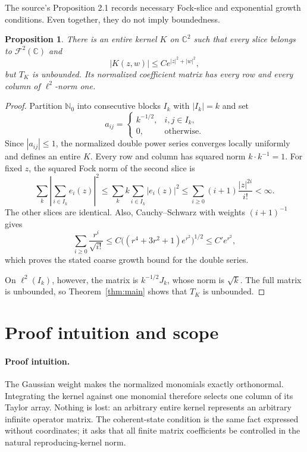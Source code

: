 \documentclass[11pt]{article}
\newtheorem{proposition}[theorem]{Proposition}
\theoremstyle{remark}
\newcommand{\C}{\mathbb{C}}
\newcommand{\F}{\mathcal{F}}
\begin{document}
The source's Proposition 2.1 records necessary Fock-slice and exponential
growth conditions.  Even together, they do not imply boundedness.

\begin{proposition}\label{prop:block}
There is an entire kernel $K$ on $\C^2$ such that every slice belongs to
$\F^2(\C)$ and
\[
 |K(z,w)|\leq C e^{|z|^2+|w|^2},
\]
but $T_K$ is unbounded.  Its normalized coefficient matrix has every row and
every column of $\ell^2$-norm one.
\end{proposition}

\begin{proof}
Partition $\mathbb N_0$ into consecutive blocks $I_k$ with $|I_k|=k$ and set
\[
 a_{ij}=\begin{cases}
 k^{-1/2},&i,j\in I_k,\\
 0,&\text{otherwise}.
 \end{cases}
\]
Since $|a_{ij}|\leq1$, the normalized double power series converges locally
uniformly and defines an entire $K$.  Every row and column has squared norm
$k\cdot k^{-1}=1$.  For fixed $z$, the squared Fock norm of the second slice
is
\[
 \sum_k\left|\sum_{i\in I_k}e_i(z)\right|^2
 \leq\sum_k k\sum_{i\in I_k}|e_i(z)|^2
 \leq\sum_{i\geq0}(i+1)\frac{|z|^{2i}}{i!}<\infty.
\]
The other slices are identical.  Also, Cauchy--Schwarz with weights
$(i+1)^{-1}$ gives
\[
 \sum_{i\geq0}\frac{r^i}{\sqrt{i!}}
 \leq C\bigl((r^4+3r^2+1)e^{r^2}\bigr)^{1/2}
 \leq C'e^{r^2},
\]
which proves the stated coarse growth bound for the double series.

On $\ell^2(I_k)$, however, the matrix is $k^{-1/2}J_k$, whose norm is
$\sqrt{k}$.  The full matrix is unbounded, so Theorem~\ref{thm:main} shows
that $T_K$ is unbounded.
\end{proof}

\section{Proof intuition and scope}

\paragraph{Proof intuition.}
The Gaussian weight makes the normalized monomials exactly orthonormal.
Integrating the kernel against one monomial therefore selects one column of
its Taylor array.  Nothing is lost: an arbitrary entire kernel represents an
arbitrary infinite operator matrix.  The coherent-state condition is the
same fact expressed without coordinates; it asks that all finite matrix
coefficients be controlled in the natural reproducing-kernel norm.
\end{document}
